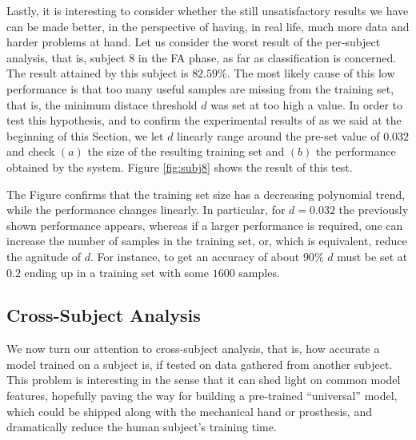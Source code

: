 \documentclass[10pt]{bmc_article}
\newenvironment{bmcformat}{\begin{raggedright}\baselineskip20pt\sloppy\setboolean{publ}{false}}{\end{raggedright}\baselineskip20pt\sloppy}
\begin{document}
\begin{bmcformat}
Lastly, it is interesting to consider whether the still unsatisfactory
results we have can be made better, in the perspective of having, in
real life, much more data and harder problems at hand. Let us consider
the worst result of the per-subject analysis, that is, subject $8$ in
the FA phase, as far as classification is concerned. The result
attained by this subject is $82.59\%$. The most likely cause of this
low performance is that too many useful samples are missing from the
training set, that is, the minimum distace threshold $d$ was set at
too high a value. In order to test this hypothesis, and to confirm the
experimental results of
\cite{2008.BioCyb} as we said at the beginning of this Section, we
let $d$ linearly range around the pre-set value of $0.032$ and check
$(a)$ the size of the resulting training set and $(b)$ the performance
obtained by the system. Figure \ref{fig:subj8} shows the result of
this test.


The Figure confirms that the training set size has a decreasing
polynomial trend, while the performance changes linearly. In
particular, for $d=0.032$ the previously shown performance appears,
whereas if a larger performance is required, one can increase the
number of samples in the training set, or, which is equivalent, reduce
the agnitude of $d$. For instance, to get an accuracy of about $90\%$
$d$ must be set at $0.2$ ending up in a training set with some $1600$
samples.

\subsection*{Cross-Subject Analysis}

We now turn our attention to cross-subject analysis, that is, how
accurate a model trained on a subject is, if tested on data gathered
from another subject. This problem is interesting in the sense that it
can shed light on common model features, hopefully paving the way for
building a pre-trained ``universal'' model, which could be shipped
along with the mechanical hand or prosthesis, and dramatically reduce
the human subject's training time.


\end{bmcformat}
\end{document}
